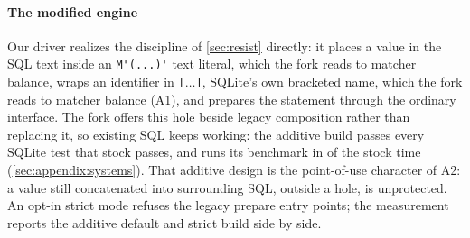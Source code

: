 \paragraph{The modified engine}
Our driver realizes the discipline of \cref{sec:resist} directly: it places a
value in the SQL text inside an \verb|M'(...)'| text literal, which the fork reads to
matcher balance, wraps an identifier in
\verb|[|$\dots$\verb|]|, SQLite's own bracketed name, which the fork reads to
matcher balance (A1), and
prepares the statement through the ordinary interface.
The fork offers this hole beside legacy composition rather than replacing it, so
existing SQL keeps working: the additive build passes every SQLite test that
stock passes, and runs its benchmark in \dataPerfSpeedtestRatio of the stock time
(\cref{sec:appendix:systems}).
That additive design is the
point-of-use character of A2: a value still concatenated into surrounding SQL,
outside a hole, is unprotected. An opt-in strict mode refuses the legacy prepare
entry points; the measurement reports the additive default and strict build side
by side.

